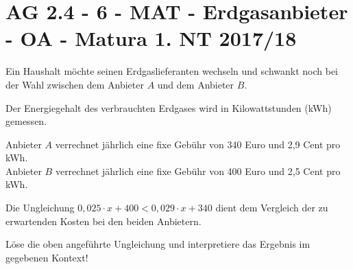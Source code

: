 \section{AG 2.4 - 6 - MAT - Erdgasanbieter - OA - Matura 1. NT 2017/18}

\begin{beispiel}[AG 2.4]{1}
Ein Haushalt möchte seinen Erdgaslieferanten wechseln und schwankt noch bei der Wahl zwischen dem Anbieter $A$ und dem Anbieter $B$.

Der Energiegehalt des verbrauchten Erdgases wird in Kilowattstunden (kWh) gemessen.

Anbieter $A$ verrechnet jährlich eine fixe Gebühr von 340 Euro und 2,9 Cent pro kWh.\\
Anbieter $B$ verrechnet jährlich eine fixe Gebühr von 400 Euro und 2,5 Cent pro kWh.

Die Ungleichung $0,025\cdot x+400<0,029\cdot x+340$ dient dem Vergleich der zu erwartenden Kosten bei den beiden Anbietern.

Löse die oben angeführte Ungleichung und interpretiere das Ergebnis im gegebenen Kontext!

\end{beispiel}